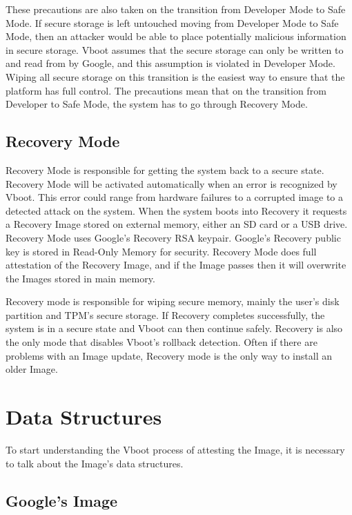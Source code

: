 These precautions are also taken on the transition from Developer Mode to Safe Mode. 
If secure storage is left untouched moving from Developer Mode to Safe Mode, then an attacker would be able to place potentially malicious information in secure storage.
Vboot assumes that the secure storage can only be written to and read from by
Google, and this assumption is violated in Developer Mode. 
Wiping all secure storage on this transition is the easiest way to ensure that the platform has full control.
The precautions mean that on the transition from Developer to Safe Mode, the system has to go through Recovery Mode.

\subsection{Recovery Mode}

Recovery Mode is responsible for getting the system back to a secure state.
Recovery Mode will be activated automatically when an error is recognized by Vboot.
This error could range from hardware failures to a corrupted image to a detected attack on the system.
When the system boots into Recovery it requests a Recovery Image stored on external memory, either an SD card or a USB drive.
Recovery Mode uses Google's Recovery RSA keypair.
Google's Recovery public key is stored in Read-Only Memory for security.
Recovery Mode does full attestation of the Recovery Image, and if the Image
passes then it will overwrite the Images stored in main memory.

Recovery mode is responsible for wiping secure memory, mainly the user's disk partition and TPM's secure storage.
If Recovery completes successfully, the system is in a secure state and Vboot can then continue safely.
Recovery is also the only mode that disables Vboot's rollback detection.
Often if there are problems with an Image update, Recovery mode is the only way
to install an older Image. 

\section{Data Structures}\label{sec:data-structures}

To start understanding the Vboot process of attesting the Image, it is necessary
to talk about the Image's data structures.

\subsection{Google's Image}


